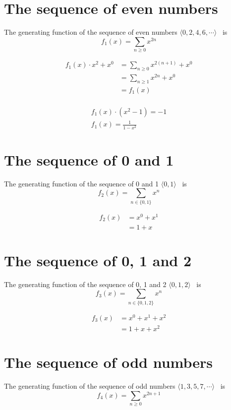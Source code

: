 \documentclass{article}
\begin{document}
\section{The sequence of even numbers}
The generating function of the sequence of even numbers $\langle 0, 2, 4, 6, \cdots \rangle$ \ is\\
$${f_1(x)} = {\sum_{n \geq 0} x^{2n}}$$

\begin{align*}
    f_1(x) \cdot x^2 + x^0 & = \sum_{n \geq 0} x^{2(n + 1)} + x^0 \\
                           & = \sum_{n \geq 1} x^{2n} + x^0       \\
                           & = f_1(x)                             \\
\end{align*}

\begin{align*}
    f_1(x) \cdot (x^2 - 1) = -1 \\
    f_1(x) = \frac{1}{1 - x^2}
\end{align*}

\section{The sequence of 0 and 1}
The generating function of the sequence of 0 and 1 $\langle 0, 1 \rangle$ \ is\\
$$f_2(x) = \sum_{n \in \{0, 1\}} x^n$$

\begin{align*}
    f_2(x) & = x^0 + x^1 \\
           & = 1 + x
\end{align*}

\section{The sequence of 0, 1 and 2}
The generating function of the sequence of 0, 1 and 2 $\langle 0, 1, 2 \rangle$ \ is\\
$$f_3(x) = \sum_{n \in \{0, 1, 2\}} x^n$$

\begin{align*}
    f_3(x) & = x^0 + x^1 + x^2 \\
           & = 1 + x + x^2
\end{align*}

\section{The sequence of odd numbers}
The generating function of the sequence of odd numbers $\langle 1, 3, 5, 7, \cdots \rangle$ \ is\\
$${f_4(x)} = {\sum_{n \geq 0} x^{2n + 1}}$$
\end{document}
